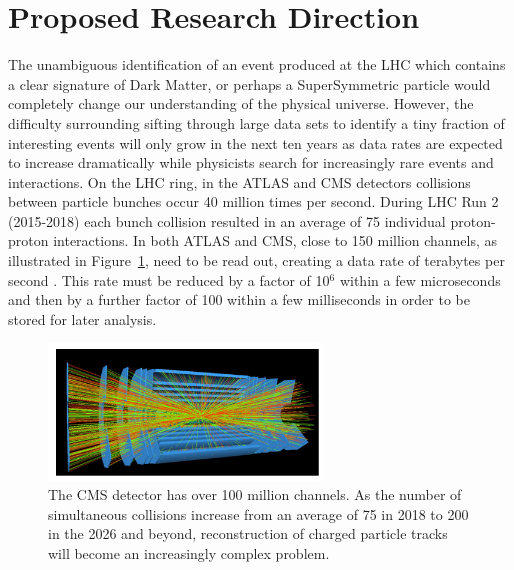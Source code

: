 \documentclass[preprint,12pt]{elsarticle}
\begin{document}
\section{Proposed Research Direction}
The unambiguous identification of an event produced at the 
LHC which contains a clear signature of Dark Matter, or perhaps 
a SuperSymmetric particle would completely change our understanding 
of the physical universe. However, the difficulty surrounding sifting through 
large data sets to identify a tiny fraction of interesting events 
will only grow in the next ten years as data rates are expected to 
increase dramatically while physicists search for increasingly rare 
events and interactions. On the LHC ring, in the ATLAS and CMS detectors 
collisions between particle bunches occur 40 million times per second. 
During LHC Run 2 (2015-2018) each bunch collision resulted in an average of 
75 individual proton-proton interactions. In both ATLAS and CMS, close 
to 150 million channels, as illustrated in Figure~\ref{fig:millionchannels}, need to be read out, 
creating a data rate of terabytes per second \cite{RoadMapComputing, big_data_computing}. This rate must be 
reduced by a factor of 10$^{6}$ within a few microseconds and then 
by a further factor of 100 within a few milliseconds in order to be stored
for later analysis.
\begin{figure}[htbp]
\centering
     \includegraphics[trim=0 0 0 0,clip,width=0.65\textwidth]{MillionChannels.png}
     \caption{The CMS detector has over 100 million channels. As the number of simultaneous collisions increase from an average of 75 in 2018 to 200 in the 2026 and beyond, 
     reconstruction of charged particle tracks will become an increasingly complex problem.}
     \label{fig:millionchannels}
\end{figure}

\end{document}
